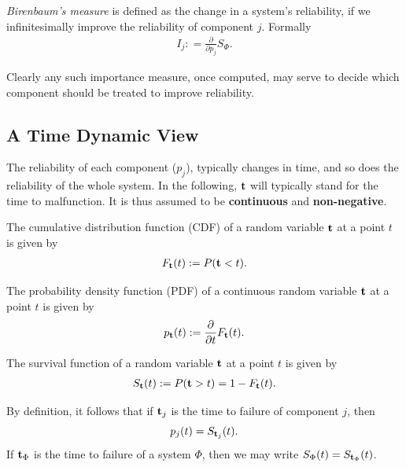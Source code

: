 \begin{definition}
\emph{Birenbaum's measure} is defined as the change in a system's reliability, if we infinitesimally improve the reliability of component $j$.
Formally 
\begin{align}
	I_j: =\frac{\partial}{\partial p_j} S_{\Phi}.
\end{align}
\end{definition}


Clearly any such importance measure, once computed, may serve to decide which component should be treated to improve reliability.







\subsection{A Time Dynamic View}
The reliability of each component ($p_j$), typically changes in time, and so does the reliability of the whole system.
In the following, $\mathbf{t}$ will typically stand for the time to malfunction. It is thus assumed to be \textbf{continuous} and \textbf{non-negative}.


\begin{definition}[CDF]
The cumulative distribution function (CDF) of a random variable $\mathbf{t}$ at a point $t$  is given by
\begin{align}
	F_{\mathbf{t}} (t):= P(\mathbf{t}<t).
\end{align}
\end{definition}

\begin{definition}[PDF]
The probability density function (PDF) of a continuous random variable $\mathbf{t}$ at a point $t$ is given by 
\begin{align}
	p_{\mathbf{t}} (t):= \frac{\partial}{\partial t}F_{\mathbf{t}} (t).
\end{align}
\end{definition}


\begin{definition}
The survival function of a random variable $\mathbf{t}$ at a point $t$ is given by 
\begin{align}
	S_{\mathbf{t}} (t):= P(\mathbf{t}>t)=1-F_{\mathbf{t}} (t).
\end{align}
\end{definition}
By definition, it follows that if $\mathbf{t}_j$ is the time to failure of component $j$, then $$p_j(t)=S_{\mathbf{t}_j} (t).$$
If $\mathbf{t}_\Phi$ is the time to failure of a system $\Phi$, then we may write $S_\Phi(t)=S_{\mathbf{t}_\Phi} (t)$.


